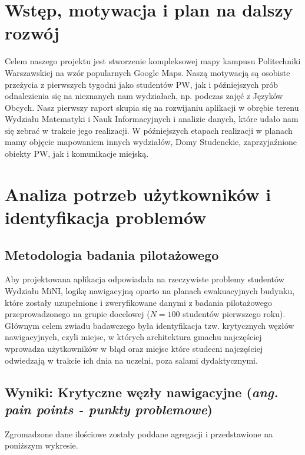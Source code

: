 \documentclass[14pt,a4paper]{extarticle}
\begin{document}
\section{Wstęp, motywacja i plan na dalszy rozwój}

Celem naszego projektu jest stworzenie kompleksowej mapy kampusu Politechniki Warszawskiej na wzór popularnych Google Maps. Naszą motywacją są osobiste przeżycia z pierwszych tygodni jako studentów PW, jak i późniejszych prób odnalezienia się na nieznanych nam wydziałach, np. podczas zajęć z Języków Obcych. Nasz pierwszy raport skupia się na rozwijaniu aplikacji w obrębie terenu Wydziału Matematyki i Nauk Informacyjnych i analizie danych, które udało nam się zebrać w trakcie jego realizacji. W późniejszych etapach realizacji w planach mamy objęcie mapowaniem innych wydziałów, Domy Studenckie, zaprzyjaźnione obiekty PW, jak i komunikacje miejską.

\section{Analiza potrzeb użytkowników i identyfikacja problemów}

\subsection{Metodologia badania pilotażowego}

Aby projektowana aplikacja odpowiadała na rzeczywiste problemy studentów Wydziału MiNI, logikę nawigacyjną oparto na planach ewakuacyjnych budynku, które zostały uzupełnione i zweryfikowane danymi z badania pilotażowego przeprowadzonego na grupie docelowej ($N = 100$ studentów pierwszego roku). Głównym celem zwiadu badawczego była identyfikacja tzw. krytycznych węzłów nawigacyjnych, czyli miejsc, w których architektura gmachu najczęściej wprowadza użytkowników w błąd oraz miejsc które studecni najczęściej odwiedzają w trakcie ich dnia na uczelni, poza salami dydaktycznymi.

\subsection{Wyniki: Krytyczne węzły nawigacyjne (\textit{ang. pain points - punkty problemowe})}

Zgromadzone dane ilościowe zostały poddane agregacji i przedstawione na poniższym wykresie.
\end{document}

